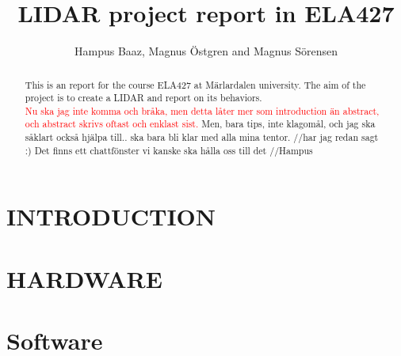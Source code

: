 

\title{\LARGE \bf
LIDAR project report in ELA427}
\author{Hampus Baaz, Magnus \"{O}stgren and Magnus S\"{o}rensen }


\maketitle
\thispagestyle{empty}
\pagestyle{empty}

\begin{abstract}
This is an report for the course ELA427 at M\"{a}rlardalen university. The aim of the project is to create a LIDAR and report on its behaviors.\\
\textcolor{red}{Nu ska jag inte komma och bråka, men detta låter mer som introduction än abstract, och abstract skrivs oftast och enklast sist.} Men, bara tips, inte klagomål, och jag ska såklart också hjälpa till.. ska bara bli klar med alla mina tentor. //har jag redan sagt :) Det finns ett chattfönster vi kanske ska hålla oss till det //Hampus
\end{abstract}


\section{INTRODUCTION}




\section{HARDWARE}\label{section:hardware}


\section{Software}\label{section:software}


\printbibliography
